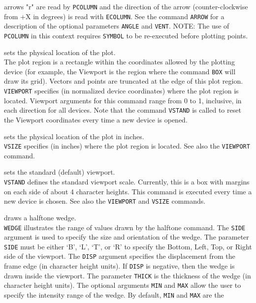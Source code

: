 	arrows "r" are read by {\tt PCOLUMN}
	and the direction of the arrow (counter-clockwise from +X in
	degrees) is read with {\tt ECOLUMN}.
	See the command {\tt ARROW} for a
	description of the optional parameters {\tt ANGLE} and
	{\tt VENT}.
	NOTE: The use of {\tt PCOLUMN}
	in this context requires {\tt SYMBOL}
	to be re-executed before plotting points.
\item [{\tt VIEWPORT VX1 VX2 VY1 VY2 } --] sets the physical location of the plot.\\
	The plot region is a rectangle within the coordinates allowed
	by the plotting device (for example, the Viewport is the region
	where the command {\tt BOX} will draw its grid).
	Vectors and points are truncated at the edge of this plot region.
	{\tt VIEWPORT} specifies (in normalized device coordinates)
	where the plot region is located.  Viewport arguments for this
	command range from 0 to 1, inclusive, in each direction for all
	devices.  Note that the command {\tt VSTAND}
	is called to reset the Viewport coordinates every time a new
	device is opened.
\item [{\tt VSIZE VX1 VX2 VY1 VY2 } --] sets the physical location of the plot in inches.\\
	{\tt VSIZE} specifies (in inches) where the plot region
	is located.
	See also the {\tt VIEWPORT} command.
\item [{\tt VSTAND } --] sets the standard (default) viewport.\\
	{\tt VSTAND} defines the standard viewport scale.
	Currently, this is a box with margins on each side of about
	4 character heights.  This command is executed every time a
	new device is chosen.
	See also the {\tt VIEWPORT} and
	{\tt VSIZE} commands.
\item [{\tt WEDGE SIDE DISP THICK [MIN MAX BOXARG] } --] draws a halftone wedge.\\
	{\tt WEDGE} illustrates the range of values drawn by
	the halftone command.  The {\tt SIDE} argument is
	used to specify the size and orientation of the wedge.
	The parameter {\tt SIDE} must be either
	`B', `L', `T', or `R' to specify the Bottom, Left, Top, or Right
	side of the viewport.  The {\tt DISP} argument specifies
	the displacement from the frame edge (in character height
	units).  If {\tt DISP} is negative, then the wedge is
	drawn inside the viewport.  The parameter {\tt THICK}
	is the thickness of the wedge (in character height units).
	The optional arguments {\tt MIN} and {\tt MAX}
	allow the user to specify the intensity range of the wedge.
	By default, {\tt MIN} and {\tt MAX} are the
